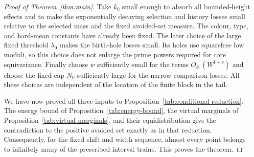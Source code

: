 \begin{proof}[Proof of Theorem~\ref{thm:main}]
Take $k_0$ small enough to absorb all bounded-height effects and to
make the exponentially decaying selection and history losses small
relative to the selected mass and the fixed avoided-set measure.
The colour, type, and hard-mean constants have already been fixed.
The later choice of the large fixed threshold $\lambda_0$ makes
the birth-hole losses small. Its holes use squarefree low moduli,
so this choice does not enlarge the prime powers required for core
equivariance. Finally choose $w$ sufficiently small for the terms
$O_{k_0}(W^{1+c})$ and choose the fixed cap $N_0$ sufficiently large
for the narrow comparison losses. All these choices are independent
of the location of the finite block in the tail.

We have now proved all three inputs to
Proposition~\ref{tab:conditional-reduction}. The energy bound of
Proposition~\ref{tab:energy-bound}, the virtual marginals of
Proposition~\ref{tab:virtual-marginals}, and their equidistribution
give the contradiction to the positive avoided set exactly as in
that reduction. Consequently, for the fixed shift and width
sequence, almost every point belongs to infinitely many of the
prescribed interval trains. This proves the theorem.
\end{proof}
